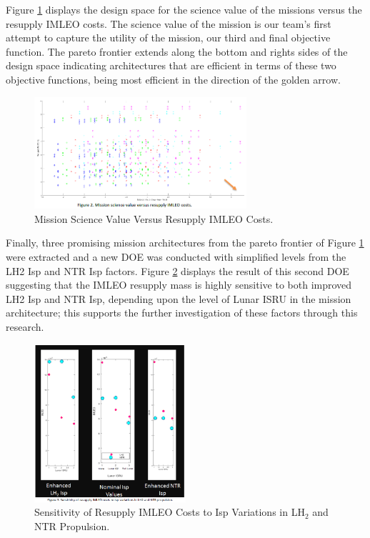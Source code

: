 \documentclass[]{aiaa-pretty}
\begin{document}
Figure \ref{fig:fulltrade} displays the design space for the science value of the missions versus the resupply IMLEO costs. The science value of the mission is our team’s first attempt to capture the utility of the mission, our third and final objective function. The pareto frontier extends along the bottom and rights sides of the design space indicating architectures that are efficient in terms of these two objective functions, being most efficient in the direction of the golden arrow.

\begin{figure}[h!]
	\centering
	\includegraphics[width=0.7\textwidth]{fulltrade}
	\caption{Mission Science Value Versus Resupply IMLEO Costs.}
	\label{fig:fulltrade}
\end{figure}

Finally, three promising mission architectures from the pareto frontier of Figure \ref{fig:fulltrade} were extracted and a new DOE was conducted with simplified levels from the LH2 Isp and NTR Isp factors. Figure \ref{fig:senstrade} displays the result of this second DOE suggesting that the IMLEO resupply mass is highly sensitive to both improved LH2 Isp and NTR Isp, depending upon the level of Lunar ISRU in the mission architecture; this supports the further investigation of these factors through this research.

\begin{figure}[ht!]
	\centering
	\includegraphics[width=0.5\textwidth]{improvetrade}
	\caption{Sensitivity of Resupply IMLEO Costs to Isp Variations in LH$_2$ and NTR Propulsion.}
	\label{fig:senstrade}
\end{figure}
\end{document}
